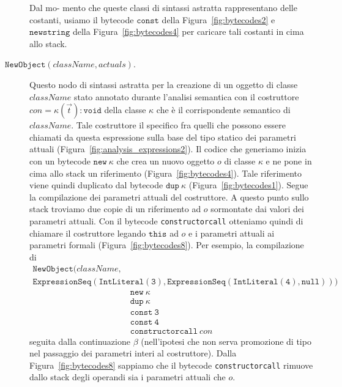 \begin{description}
  Dal mo-\linebreak
  mento che queste
  classi di sintassi astratta rappresentano delle costanti,
  usiamo il bytecode $\mathtt{const}$ della Figura~\ref{fig:bytecodes2}
  e $\mathtt{newstring}$ della Figura~\ref{fig:bytecodes4} per caricare tali
  costanti in cima allo stack.
\item[\underline{$\mathtt{NewObject(\mathit{className,\mathit{actuals}})}$}.]
  Questo nodo di sintassi astratta per la creazione di un oggetto di classe
  $\mathit{className}$ \e stato annotato durante l'analisi semantica con
  il costruttore $\mathit{con}=
  \kappa(\vec{t})\mathtt{:void}$ della classe $\kappa$ che \`e
  il corrispondente semantico di $\mathit{className}$. Tale costruttore
  \e il \piu
  specifico fra quelli che possono essere chiamati da questa espressione
  sulla base del tipo
  statico dei parametri attuali (Figura~\ref{fig:analysis_expressions2}).
  Il codice che generiamo inizia con un bytecode $\mathtt{new}\ \kappa$ che
  crea un nuovo oggetto $o$ di classe $\kappa$ e ne pone in cima allo stack
  un riferimento (Figura~\ref{fig:bytecodes4}). Tale riferimento
  viene quindi duplicato dal bytecode $\mathtt{dup}\ \kappa$
  (Figura~\ref{fig:bytecodes1}).
  Segue la compilazione dei parametri attuali del costruttore.
  A questo punto sullo stack troviamo due copie di un riferimento
  ad $o$ sormontate dai valori dei parametri
  attuali. Con il bytecode \texttt{constructorcall} otteniamo quindi di
  chiamare il costruttore legando $\mathtt{this}$ ad $o$ e i parametri
  attuali ai parametri formali (Figura~\ref{fig:bytecodes8}).
  Per esempio, la compilazione di
  \begin{multline*}
    \mathtt{NewObject(\mathit{className},}\\
    \mathtt{ExpressionSeq(IntLiteral(3),ExpressionSeq(IntLiteral(4),null)))}
  \end{multline*}
  \e
  \[\begin{array}{l}
    \mathtt{new}\ \kappa\\
    \mathtt{dup}\ \kappa\\
    \mathtt{const\ 3}\\
    \mathtt{const\ 4}\\
    \mathtt{constructorcall\ \mathit{con}}
  \end{array}\]
  seguita dalla continuazione $\beta$ (nell'ipotesi che non serva promozione
  di tipo nel passaggio dei parametri interi al costruttore).
  Dalla Figura~\ref{fig:bytecodes8} sappiamo che
  il bytecode \texttt{constructorcall}
  rimuove dallo stack degli operandi sia i parametri attuali che $o$.

\end{description}
